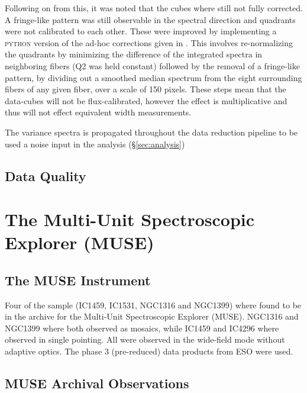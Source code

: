 
		Following on from this, it was noted that the cubes where still not fully corrected. A fringe-like pattern was still observable in the spectral direction and quadrants were not calibrated to each other. These were improved by implementing a \textsc{python} version of the ad-hoc corrections given in \citet{Lagerholm2012}. This involves re-normalizing the quadrants by minimizing the difference of the integrated spectra in neighboring fibers (Q2 was held constant) followed by the removal of a fringe-like pattern, by dividing out a smoothed median spectrum from the eight surrounding fibers of any given fiber, over a scale of 150 pixels. These steps mean that the data-cubes will not be flux-calibrated, however the effect is multiplicative and thus will not effect equivalent width measurements.  

		The variance spectra is propagated throughout the data reduction pipeline to be used a noise input in the analysis (\S \ref{sec:analysis})

	\subsection{Data Quality}
		\label{subsec:VIMOSartifacts}
\section{The Multi-Unit Spectroscopic Explorer (MUSE)}
	\label{sec:MUSE}
	\subsection{The MUSE Instrument}
		Four of the sample (IC1459, IC1531, NGC1316 and NGC1399) where found to be in the archive for the Multi-Unit Spectroscopic Explorer (MUSE). NGC1316 and NGC1399 where both observed as mosaics, while IC1459 and IC4296 where observed in single pointing. All were observed in the wide-field mode without adaptive optics. The phase 3 (pre-reduced) data products from ESO were used. 

	\subsection{MUSE Archival Observations}



